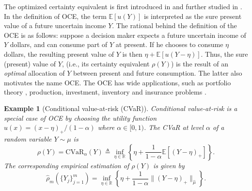 \documentclass[12pt,technote,onecolumn]{IEEEtran}
\newtheorem{example}{Example}
\begin{document}
The optimized certainty equivalent is first introduced in \cite{ben1986expected} and further studied in \cite{ben2007old}. In the definition of OCE, the term $\mathbb{E}[u(Y)]$ is interpreted as the sure present value of a future uncertain income $Y$. The rational behind the definition of the OCE is as follows: suppose a decision maker expects a future uncertain income of $Y$ dollars, and can consume part of $Y$ at present. If he chooses to consume $\eta$ dollars, the resulting present value of $Y$ is then $\eta + \mathbb{E}[u(Y-\eta)]$. Thus, the sure (present) value of $Y$, (i.e., its certainty equivalent $\rho(Y)$) is the result of an {\em optimal} allocation of $Y$ between present and future consumption. The latter also motivates the name OCE. The OCE has wide applications, such as portfolio theory \cite{ben1991portfolio},  production, investment, inventory and insurance problems \cite{ben1997duality,ben1991recourse}. 
	
	\begin{example}[Conditional value-at-risk (CVaR)]
		Conditional value-at-risk  \cite{rockafellar2000optimization}
		is a special case of OCE by
		choosing the utility function $u\left(x\right)=(x-\eta)_{+}/(1-\alpha)$
		where $\alpha\in[0,1)$. The CVaR at level $\alpha$
		of a random variable $Y\sim\mu$ is 	
		\[
		\rho\left(Y\right)=\text{CVaR}_{\alpha}\left(Y\right)\triangleq\inf_{\eta\in\mathbb{R}}\left\{ \eta+\frac{1}{1-\alpha}\mathbb{E}\left[\left(Y-\eta\right)_{+}\right]\right\}.
		\]
		The corresponding empirical estimation of $\rho(Y)$ is given by
		$$\hat{\rho}_{m}\left(\{Y_j\}^m_{j=1}\right)=
		\inf_{\eta\in\mathbb{R}}\left\{ \eta+\frac{1}{1-\alpha}\|\left(Y-\eta\right)_{+}\|_{\hat{\mu}}\right\}.
		$$
	\end{example}
\end{document}
